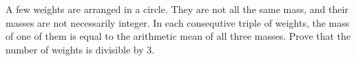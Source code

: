 \problem
A few weights are arranged in a circle.
They are not all the same mass, and their masses are not necessarily integer.
In each consequtive triple of weights, the mass of one of them is equal to the
arithmetic mean of all three masses.
Prove that the number of weights is divisible by 3.

\solution

\endproblem
